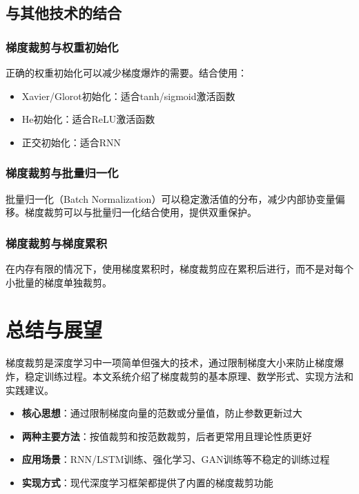 \documentclass{article}
\begin{document}
\subsection{与其他技术的结合}

\subsubsection{梯度裁剪与权重初始化}
正确的权重初始化可以减少梯度爆炸的需要。结合使用：
\begin{itemize}
    \item Xavier/Glorot初始化：适合tanh/sigmoid激活函数
    \item He初始化：适合ReLU激活函数
    \item 正交初始化：适合RNN
\end{itemize}

\subsubsection{梯度裁剪与批量归一化}
批量归一化（Batch Normalization）可以稳定激活值的分布，减少内部协变量偏移。梯度裁剪可以与批量归一化结合使用，提供双重保护。

\subsubsection{梯度裁剪与梯度累积}
在内存有限的情况下，使用梯度累积时，梯度裁剪应在累积后进行，而不是对每个小批量的梯度单独裁剪。

\section{总结与展望}

梯度裁剪是深度学习中一项简单但强大的技术，通过限制梯度大小来防止梯度爆炸，稳定训练过程。本文系统介绍了梯度裁剪的基本原理、数学形式、实现方法和实践建议。

\begin{itemize}
    \item \textbf{核心思想}：通过限制梯度向量的范数或分量值，防止参数更新过大
    \item \textbf{两种主要方法}：按值裁剪和按范数裁剪，后者更常用且理论性质更好
    \item \textbf{应用场景}：RNN/LSTM训练、强化学习、GAN训练等不稳定的训练过程
    \item \textbf{实现方式}：现代深度学习框架都提供了内置的梯度裁剪功能
\end{itemize}
\end{document}
